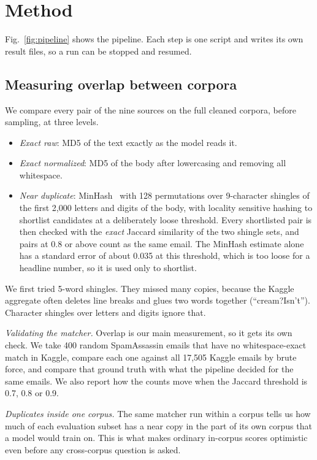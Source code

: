 \section{Method}
\label{sec:method}

Fig.~\ref{fig:pipeline} shows the pipeline. Each step is one script and writes
its own result files, so a run can be stopped and resumed.

\subsection{Measuring overlap between corpora}

We compare every pair of the nine sources on the full cleaned corpora, before
sampling, at three levels.
\begin{itemize}
\item \textit{Exact raw}: MD5 of the text exactly as the model reads it.
\item \textit{Exact normalized}: MD5 of the body after lowercasing and
removing all whitespace.
\item \textit{Near duplicate}: MinHash~\cite{broder} with 128 permutations over
9-character shingles of the first 2{,}000 letters and digits of the body, with
locality sensitive hashing to shortlist candidates at a deliberately loose
threshold. Every shortlisted pair is then checked with the \emph{exact} Jaccard
similarity of the two shingle sets, and pairs at 0.8 or above count as the same
email. The MinHash estimate alone has a standard error of about 0.035 at this
threshold, which is too loose for a headline number, so it is used only to
shortlist.
\end{itemize}

We first tried 5-word shingles. They missed many copies, because the Kaggle
aggregate often deletes line breaks and glues two words together
(``cream?Isn't''). Character shingles over letters and digits ignore that.

\textit{Validating the matcher.} Overlap is our main measurement, so it gets
its own check. We take 400 random SpamAssassin emails that have no
whitespace-exact match in Kaggle, compare each one against all 17{,}505 Kaggle
emails by brute force, and compare that ground truth with what the pipeline
decided for the same emails. We also report how the counts move when the
Jaccard threshold is 0.7, 0.8 or 0.9.

\textit{Duplicates inside one corpus.} The same matcher run within a corpus
tells us how much of each evaluation subset has a near copy in the part of its
own corpus that a model would train on. This is what makes ordinary in-corpus
scores optimistic even before any cross-corpus question is asked.

